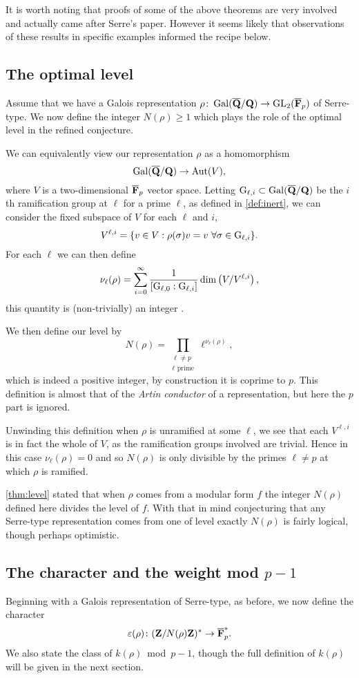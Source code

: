\documentclass[a4paper,12pt]{article}
\begin{document}
It is worth noting that proofs of some of the above theorems are very involved and actually came after Serre's paper.
However it seems likely that observations of these results in specific examples informed the recipe below.


\subsection{The optimal level}\label{subsec:level}
Assume that we have a Galois representation $\rho\colon \operatorname{Gal}(\overline{\mathbf{Q}}/\mathbf{Q}) \to \operatorname{GL}_2(\overline{\mathbf{F}}_p)$ of Serre-type.
We now define the integer $N(\rho) \ge 1$ which plays the role of the optimal level in the refined conjecture.

We can equivalently view our representation $\rho$ as a homomorphism
\[
\operatorname{Gal}(\overline{\mathbf{Q}}/\mathbf{Q}) \to \operatorname{Aut}(V),
\]
where $V$ is a two-dimensional $\overline{\mathbf{F}}_p$ vector space.
Letting $\mathrm{G}_{\ell,i}\subset \operatorname{Gal}(\overline{\mathbf{Q}}/\mathbf{Q})$ be the $i$th ramification group at $\ell$ for a prime $\ell$, as defined in \cref{def:inert}, we can consider the fixed subspace of $V$ for each $\ell$ and $i$,
\[
V^{\ell,i} = \{v\in V : \rho(\sigma) v = v\ \forall \sigma \in \G_{\ell,i}\}.
\]
For each $\ell$ we can then define
\[
\nu_\ell(\rho) = \sum_{i = 0}^{\infty} \frac{1}{[\mathrm{G}_{\ell,0} : \mathrm{G}_{\ell,i}]} \dim\left(V/V^{\ell,i}\right),
\]
this quantity is (non-trivially) an integer \cite[p. 99]{SerreLF}.

We then define our level by
\[
N(\rho) = \prod_{\substack{\ell \ne p\\ \ell\text{ prime}}} \ell^{\nu_\ell(\rho)},
\]
which is indeed a positive integer, by construction it is coprime to $p$.
This definition is almost that of the \emph{Artin conductor} of a representation, but here the $p$ part is ignored.

\begin{rmk}\label{rmk:unram}
Unwinding this definition when $\rho$ is unramified at some $\ell$, we see that each $V^{\ell,i}$ is in fact the whole of $V$, as the ramification groups involved are trivial.
Hence in this case $\nu_\ell(\rho) = 0$ and so $N(\rho)$ is only divisible by the primes $\ell \ne p$ at which $\rho$ is ramified.
\end{rmk}

\cref{thm:level} stated that when $\rho$ comes from a modular form $f$ the integer $N(\rho)$ defined here divides the level of $f$.
With that in mind conjecturing that any Serre-type representation comes from one of level exactly $N(\rho)$ is fairly logical, though perhaps optimistic.


\subsection{The character and the weight mod $p-1$}\label{subsec:char}
Beginning with a Galois representation of Serre-type, as before, we now define the character
\[
\varepsilon(\rho)\colon  (\mathbf{Z}/N(\rho)\mathbf{Z})^* \to \overline{\mathbf{F}}_p^*.
\]
We also state the class of $k(\rho)$~mod~$p-1$, though the full definition of $k(\rho)$ will be given in the next section.
\end{document}
